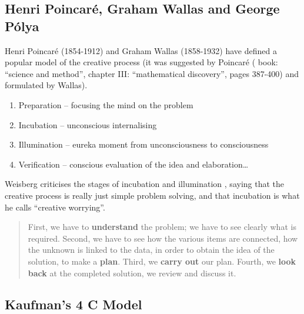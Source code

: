 \subsection{Henri Poincaré, Graham Wallas and George Pólya}

Henri Poincaré (1854-1912) \citep{Poincare2001} and Graham Wallas (1858-1932) \citep{Wallas1926} have defined a popular model \citep{Boden2003, Koestler1964, Partridge1994} of the creative process (it was suggested by Poincaré  (\citep{Poincare2001} book: ``science and method'', chapter III: ``mathematical discovery'', pages 387-400) and formulated by Wallas).

\begin{enumerate}
  \item Preparation – focusing the mind on the problem
  \item Incubation – unconscious internalising
  \item Illumination – eureka moment from unconsciousness to consciousness
  \item Verification – conscious evaluation of the idea and elaboration…
\end{enumerate}

Weisberg criticises the stages of incubation and illumination \citep[referred to by][]{Partridge1994}, saying that the creative process is really just simple problem solving, and that incubation is what he calls ``creative worrying''.

\begin{quote}
  First, we have to \textbf{understand} the problem; we have to see clearly what is required. Second, we have to see how the various items are connected, how the unknown is linked to the data, in order to obtain the idea of the solution, to make a \textbf{plan}. Third, we \textbf{carry out} our plan. Fourth, we \textbf{look back} at the completed solution, we review and discuss it. \citep[p.5-6, his emphasis]{Polya1957}
\end{quote}

\subsection{Kaufman's 4 C Model}

